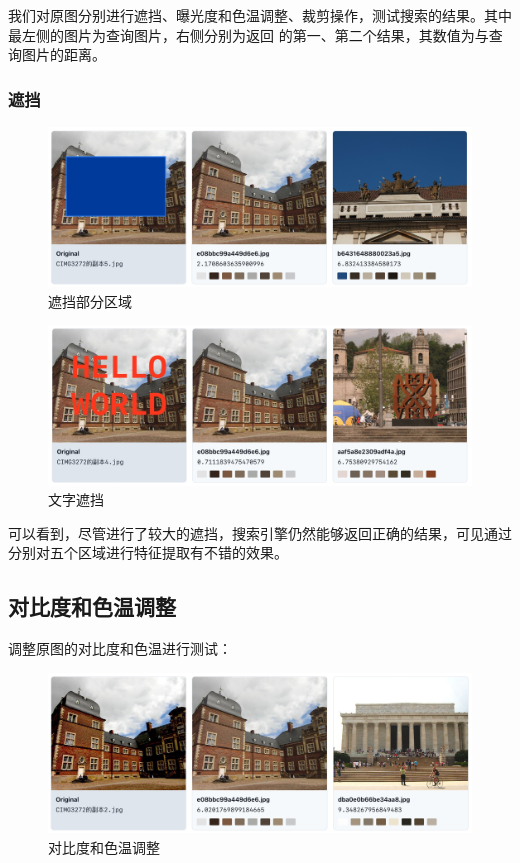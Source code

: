 \documentclass[a4paper]{article}
\begin{document}
我们对原图分别进行遮挡、曝光度和色温调整、裁剪操作，测试搜索的结果。其中最左侧的图片为查询图片，右侧分别为返回
的第一、第二个结果，其数值为与查询图片的距离。

\subsubsection{遮挡}

\begin{figure}[H]
    \centering
    \includegraphics[width=\textwidth]{assets/test-1-1.jpg}
    \caption{遮挡部分区域}
    \label{fig:search_result_1_1}
\end{figure}

\begin{figure}[H]
    \centering
    \includegraphics[width=\textwidth]{assets/test-1-2.jpg}
    \caption{文字遮挡}
    \label{fig:search_result_1_2}
\end{figure}

可以看到，尽管进行了较大的遮挡，搜索引擎仍然能够返回正确的结果，可见通过分别对五个区域进行特征提取有不错的效果。

\subsection{对比度和色温调整}

调整原图的对比度和色温进行测试：

\begin{figure}[H]
    \centering
    \includegraphics[width=\textwidth]{assets/test-1-3.jpg}
    \caption{对比度和色温调整}
    \label{fig:search_result_1_3}
\end{figure}
\end{document}
